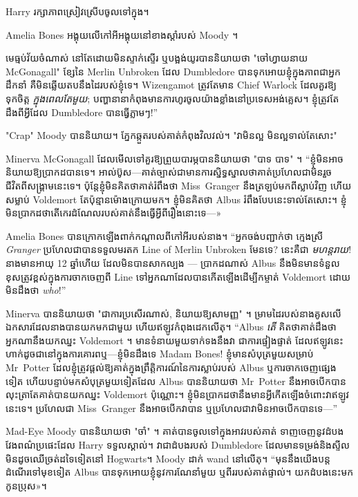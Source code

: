 Harry រក្សា​ភាព​ស្រៀវ​ស្រើប​ចូល​ទៅ​ក្នុង។

Amelia Bones អង្គុយលើកៅអីអង្គុយនៅខាងស្តាំរបស់ Moody ។

មេធ្មប់វ័យចំណាស់ នៅតែដោយមិនស្ទាក់ស្ទើរ ឬបង្អង់យូរបាននិយាយថា "ចៅហ្វាយនាយ McGonagall" ខ្សែនៃ Merlin Unbroken ដែល Dumbledore បានទុកអោយខ្ញុំក្នុងភាពជាអ្នកដឹកនាំ គឺមិនឆ្លើយតបនឹងដៃរបស់ខ្ញុំទេ។ Wizengamot ត្រូវតែមាន Chief Warlock ដែលគួរឱ្យទុកចិត្ត \emph{ក្នុងពេលតែមួយ}; បញ្ហា​នានា​កំពុង​មាន​ការ​ហូរ​ចូល​យ៉ាង​ខ្លាំង​នៅ​ប្រទេស​អង់គ្លេស។ ខ្ញុំត្រូវតែដឹងពីអ្វីដែល Dumbledore បានធ្វើភ្លាមៗ!”

"Crap" Moody បាននិយាយ។ ភ្នែកឆ្កួតរបស់គាត់កំពុងវិលវល់។ "វាមិនល្អ មិនល្អទាល់តែសោះ"

Minerva McGonagall ដែលមើលទៅគួរឱ្យព្រួយបារម្ភបាននិយាយថា "បាទ បាទ" ។ “ខ្ញុំមិនអាចនិយាយឱ្យប្រាកដបានទេ។ អាល់ប៊ូស—គាត់ច្បាស់ជាមានការស្និទ្ធស្នាលថាគាត់ប្រហែលជាមិនរួចជីវិតពីសង្គ្រាមនេះទេ។ ប៉ុន្តែ​ខ្ញុំ​មិន​គិត​ថា​គាត់​រំពឹង​ថា Miss~Granger នឹង​ត្រឡប់​មក​ពី​ស្លាប់​វិញ ហើយ​សម្លាប់ Voldemort តែ​ប៉ុន្មាន​ម៉ោង​ក្រោយ​មក។ ខ្ញុំ​មិន​គិត​ថា Albus រំពឹង​បែប​នេះ​ទាល់​តែ​សោះ។ ខ្ញុំ​មិន​ប្រាកដ​ថា​តើ​កេរដំណែល​របស់​គាត់​នឹង​ធ្វើ​អ្វី​ពី​រឿង​នោះ​ទេ—»

Amelia Bones បានក្រោកឡើងពាក់កណ្តាលពីកៅអីរបស់នាង។ “អ្នកចង់បញ្ជាក់ថា ក្មេងស្រី \emph{Granger} ប្រហែលជាបានទទួលមរតក Line of Merlin Unbroken មែនទេ? នេះគឺជា \emph{មហន្តរាយ}! នាងមានអាយុ 12 ឆ្នាំហើយ ដែលមិនបានសាកល្បង — ប្រាកដណាស់ Albus នឹងមិនមានទំនួលខុសត្រូវខ្ពស់ក្នុងការចាកចេញពី Line ទៅអ្នកណាដែលបានកើតឡើងដើម្បីកម្ចាត់ Voldemort ដោយមិនដឹងថា \emph{who}!”

Minerva បាននិយាយថា "ជាការប្រសើរណាស់, និយាយឱ្យសាមញ្ញ" ។ ម្រាម​ដៃ​របស់​នាង​គូស​លើ​ឯកសារ​ដែល​នាង​បាន​យក​មក​ជាមួយ ហើយ​ឥឡូវ​កំពុង​ដេក​លើ​តុ។ “Albus \emph{តើ} គិតថាគាត់ដឹងថាអ្នកណានឹងយកឈ្នះ Voldemort ។ មាន​ទំនាយ​មួយ​ទាក់ទង​នឹង​វា ជា​ការ​ផ្ទៀងផ្ទាត់ ដែល​ឥឡូវ​នេះ​ហាក់​ដូច​ជា​នៅ​ក្នុង​ការ​គោរព​ឬ—ខ្ញុំ​មិន​ដឹង​ទេ Madam Bones! ខ្ញុំមានសំបុត្រមួយសម្រាប់ Mr~Potter ដែលខ្ញុំត្រូវផ្តល់ឱ្យគាត់ក្នុងព្រឹត្តិការណ៍នៃការស្លាប់របស់ Albus ឬការចាកចេញផ្សេងទៀត ហើយបន្ទាប់មកសំបុត្រមួយទៀតដែល Albus បាននិយាយថា Mr~Potter នឹងអាចបើកបានលុះត្រាតែគាត់បានយកឈ្នះ Voldemort ប៉ុណ្ណោះ។ ខ្ញុំ​មិន​ប្រាកដ​ថា​នឹង​មាន​អ្វី​កើត​ឡើង​ចំពោះ​វា​ឥឡូវ​នេះ​ទេ។ ប្រហែលជា Miss~Granger នឹងអាចបើកវាបាន ឬប្រហែលជាវាមិនអាចបើកបានទេ—”

Mad-Eye Moody បាននិយាយថា "ចាំ" ។ គាត់បានចូលទៅក្នុងអាវរបស់គាត់ ទាញចេញនូវដំបងវែងពណ៌ប្រផេះដែល Harry ទទួលស្គាល់។ វា​ជា​ដំបង​របស់ Dumbledore ដែល​មាន​ទម្រង់​និង​ស្ទីល​មិន​ដូច​ឈើ​ច្រត់​ដទៃ​ទៀត​នៅ Hogwarts។ Moody ដាក់ wand នៅលើតុ។ “មុននឹងយើងបន្តដំណើរទៅមុខទៀត Albus បានទុកអោយខ្ញុំនូវការណែនាំមួយ ឬពីររបស់គាត់ផ្ទាល់។ យក​ដំបង​នេះ​មក​កូន​ប្រុស»។

